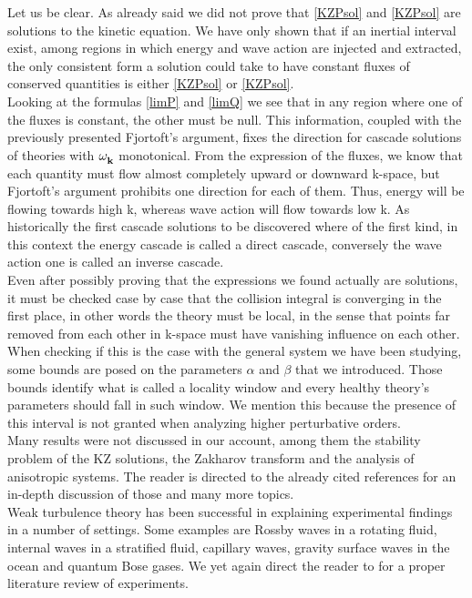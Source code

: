 Let us be clear. As already said we did not prove that \eqref{KZPsol} and \eqref{KZPsol} are solutions to the kinetic equation. We have only shown that if 
an inertial interval exist, among regions in which energy and wave action are injected and extracted, the only consistent form a solution could take to have constant fluxes of conserved quantities is either \eqref{KZPsol} or \eqref{KZPsol}. \\
Looking at the formulas \eqref{limP} and \eqref{limQ} we see that in any region where one of the fluxes is constant, the other must be null. This information, coupled 
with the previously presented Fjortoft's argument, fixes the direction for cascade solutions of theories with $\omega^{}_{\mathbf{k}}$ monotonical. From the expression of the fluxes, 
we know that each quantity must flow almost completely upward or downward k-space, but Fjortoft's argument prohibits one direction for each of them. Thus, energy
will be flowing towards high k, whereas wave action will flow towards low k. As historically the first cascade solutions to be discovered where of the first kind, 
in this context the energy cascade is called a direct cascade, conversely the wave action one is called an inverse cascade. \\

Even after possibly proving that the expressions we found actually are solutions, it must be checked case by case that the collision integral is converging in the first place,  in other words the theory must be local, in the sense that points far removed from each other in k-space must have vanishing influence on each other. \\
When checking if this is the case with the general system we have been studying, some bounds are posed on the parameters $\alpha$ and $\beta$ that we introduced.
Those bounds identify what is called a locality window and every healthy theory's parameters should fall in such window. We mention this because 
the presence of this interval is not granted when analyzing higher perturbative orders.\\ 

Many results were not discussed in our account, among them the stability problem of the KZ solutions, the Zakharov transform and the analysis of anisotropic systems. The reader is directed to the 
already cited references for an in-depth discussion of those and many more topics.\\

Weak turbulence theory has been successful in explaining experimental findings in a number of settings. Some examples are Rossby waves in a rotating fluid, internal waves 
in a stratified fluid, capillary waves, gravity surface waves in the ocean and quantum Bose gases. We yet again direct the reader to \cite{Nazarenko2011} for a proper literature review of experiments.\\

